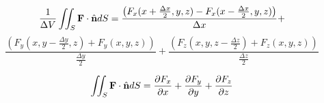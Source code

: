 \documentclass{article}
\begin{document}
\begin{enumerate}
    \[ \frac{1}{\Delta V} \iint_S \bb{F} \cdot \bh{n} dS = \frac{\left( F_x(x + \frac{\Delta x}{2}, y, z) - F_x(x - \frac{\Delta x}{2}, y, z) \right)}{\Delta x} + \]
    \[ \frac{\left( F_y(x, y - \frac{\Delta y}{2}, z) + F_y(x,y,z) \right)}{\frac{\Delta y}{2}} + \frac{\left( F_z(x, y, z - \frac{\Delta z}{2}) + F_z(x,y,z) \right)}{\frac{\Delta z}{2}} \]

    \[\iint_S \bb{F} \cdot \bh{n} dS = \pd[F_x]{x} + \pd[F_y]{y} + \pd[F_z]{z}\]
\end{enumerate}
\end{document}
